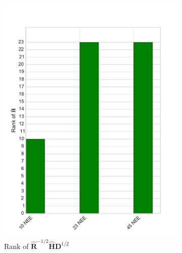 \documentclass[11pt]{article}
\begin{document}
\begin{figure}[ht]
    \centering
    \begin{subfigure}[b]{0.4\textwidth}
        \includegraphics[width=\textwidth]{dalec2_obsrankcvt.pdf}
        \caption{Rank of $\hat{\textbf{R}}^{-1/2}\hat{\textbf{H}}\textbf{D}^{1/2}$}
        \label{fig:D2_observailityrankcvt}
    \end{subfigure}
    \begin{subfigure}[b]{0.4\textwidth}

\end{subfigure}
\end{figure}
\end{document}
